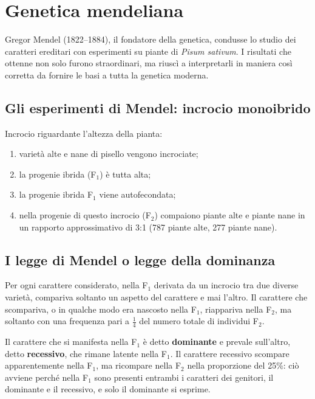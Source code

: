 \section{Genetica mendeliana}

Gregor Mendel (1822--1884), il fondatore della genetica, condusse lo studio dei caratteri ereditari con esperimenti su piante di \textit{Pisum sativum}. I risultati che ottenne non solo furono straordinari, ma riuscì a interpretarli in maniera così corretta da fornire le basi a tutta la genetica moderna.

\subsection{Gli esperimenti di Mendel: incrocio monoibrido}

Incrocio riguardante l'altezza della pianta:
\begin{enumerate}
  \item varietà alte e nane di pisello vengono incrociate;
  \item la progenie ibrida (F$_1$) è tutta alta;
  \item la progenie ibrida F$_1$ viene autofecondata;
  \item nella progenie di questo incrocio (F$_2$) compaiono piante alte e piante nane in un rapporto approssimativo di 3:1 (787 piante alte, 277 piante nane).
\end{enumerate}

\subsection{I legge di Mendel o legge della dominanza}

Per ogni carattere considerato, nella F$_1$ derivata da un incrocio tra due diverse varietà, compariva soltanto un aspetto del carattere e mai l'altro. Il carattere che scompariva, o in qualche modo era nascosto nella F$_1$, riappariva nella F$_2$, ma soltanto con una frequenza pari a $\frac{1}{4}$ del numero totale di individui F$_2$.

Il carattere che si manifesta nella F$_1$ è detto \textbf{dominante} e prevale sull'altro, detto \textbf{recessivo}, che rimane latente nella F$_1$. Il carattere recessivo scompare apparentemente nella F$_1$, ma ricompare nella F$_2$ nella proporzione del 25\%: ciò avviene perché nella F$_1$ sono presenti entrambi i caratteri dei genitori, il dominante e il recessivo, e solo il dominante si esprime.

